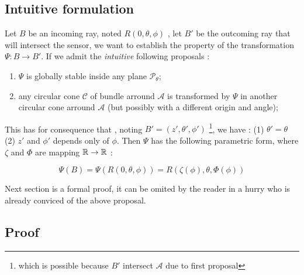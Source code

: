 
\subsection{Intuitive formulation}

Let $B$ be an incoming ray, noted $ R(0,\theta,\phi)$ , let $B'$ be the outcoming ray  that will intersect the sensor,
we want to establish the property of the transformation  $ \Psi : B \rightarrow B'$.
If we admit the \emph{intuitive} following proposals :


\begin{proposal}  \;
\label{PhysRadMod}
\begin{enumerate}
    \item  $\Psi$ is globally stable inside any plane  $\mathcal{P}_{\theta}$; \label{PhysRadModPlane}

    \item  any  circular cone $\mathcal{C}$ of bundle  arround $\mathcal{A}$ is
	    transformed by $\Psi$ in another circular cone arround $\mathcal{A}$  (but possibly with a different origin and angle);
\end{enumerate}
\end{proposal}

This has for consequence that , noting  $B'=(z',\theta',\phi')$ \footnote{which is possible because $B'$ intersect  $\mathcal{A}$ due to first proposal},
we have : (1) $\theta'=\theta$  (2)  $z'$ and $\phi'$ depends only of $\phi$. 
Then $\Psi $ has the following parametric form, where $\zeta$ and $\Phi$ are mapping $\mathbb{R} \rightarrow \mathbb{R}$ :

\begin{equation}
	\Psi(B) = \Psi(R(0,\theta,\phi)) = R(\zeta(\phi) ,\theta,\Phi(\phi))
\end{equation}

Next section is a formal proof,  it can be omited by the reader in a hurry who is already conviced of the above proposal.



\subsection{Proof}


